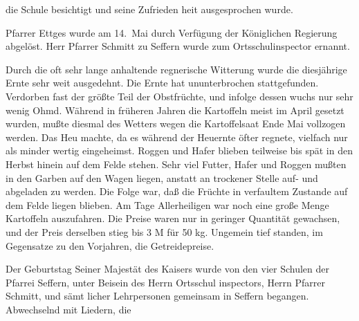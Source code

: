 

die Schule besichtigt und seine Zufrieden\ohb
heit ausgesprochen wurde.

\pend
{}
\pstart

Pfarrer Ettges wurde am 14.\ Mai durch\ob
Verfügung der Königlichen Regierung abgelöst.\ob
Herr Pfarrer Schmitt zu Seffern wurde zum\ob
Ortsschulinspector ernannt.

\pend
{}
\pstart

Durch die oft sehr lange anhaltende regnerische\ob
Witterung wurde die diesjährige Ernte sehr\ob
weit ausgedehnt. Die Ernte hat ununterbrochen\ob
stattgefunden. Verdorben fast der größte Teil\ob
der Obstfrüchte, und infolge dessen wuchs\ob
nur sehr wenig Ohmd. Während in früheren\ob
Jahren die Kartoffeln meist im April gesetzt\ob
wurden, mußte diesmal des Wetters wegen\ob
die Kartoffelsaat Ende Mai vollzogen werden.\ob
Das Heu machte, da es während der Heuernte\ob
öfter regnete, vielfach nur als minder\ohb
wertig eingeheimst. Roggen und Hafer blieben\ob
teilweise bis spät in den Herbst hinein auf dem\ob
Felde stehen. Sehr viel Futter, Hafer und Roggen\ob
mußten in den Garben auf den Wagen liegen,\ob
anstatt an trockener Stelle auf- und abgeladen\ob
zu werden. Die Folge war, daß die Früchte\ob
in verfaultem Zustande auf dem Felde liegen\ob
blieben. Am Tage Allerheiligen war noch eine\ob
große Menge Kartoffeln auszufahren. Die Preise\ob
waren nur in geringer Quantität gewachsen,\ob
und der Preis derselben stieg bis 3 M für 50 kg.\ob
Ungemein tief standen, im Gegensatze zu den\ob
Vorjahren, die Getreidepreise.

\pend
{}
\pstart


\pend
{}
\pstart

Der Geburtstag Seiner Majestät des Kaisers\ob
wurde von den vier Schulen der Pfarrei\ob
Seffern, unter Beisein des Herrn Ortsschul\ohb
inspectors, Herrn Pfarrer Schmitt, und sämt\ohb
licher Lehrpersonen gemeinsam in Seffern\ob
begangen. Abwechselnd mit Liedern, die
\pend
